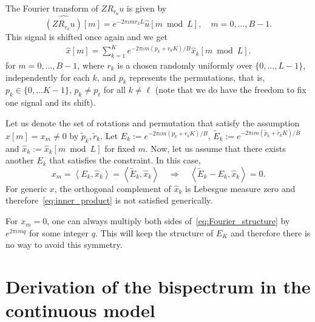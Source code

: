 \documentclass[english,12pt]{article}
\newcommand{\I}{\iota}
\newcommand{\hx}{\hat{x}}
\numberwithin{equation}{section}
\numberwithin{thm}{section} %
\begin{document}
The Fourier transform of $ZR_{r_k}u$ is  given by 
\begin{equation}
\widehat{(ZR_{r_k}u)}[m] = e^{-2\pi\I m r_k L} \hat{u}[m\bmod L], \quad m=0,\ldots,B-1.
\end{equation}
This signal is shifted once again and we get
\begin{eqnarray} \label{eq:Fourier_structure}
\hat{x}[m] = \sum_{k=1}^K e^{-2\pi\I m( p_k+r_k K)/B} \hat{x}_k[m \bmod L]. 
\end{eqnarray}
for $m=0,\ldots,B-1$, 
where $r_k$ is a chosen randomly uniformly over $\{0,\ldots,L-1\}$, independently for each $k$, and $p_k$ represents the permutations, that is, $p_k\in\{0,\ldots K-1\}$, $p_k\neq p_\ell$ for all $k\neq \ell$ (note that we do have the freedom to fix one signal and its shift). 

Let us denote the set of rotations and permutation that satisfy the assumption  $\hx[m]=x_m\neq 0$ by $\tilde{p}_k,\tilde{r}_k$. Let $E_k:=e^{-2\pi\I m( p_k+r_k K)/B}$, $\tilde{E}_k:=e^{-2\pi\I m( \tilde{p}_k+\tilde{r}_k K)/B}$ and $\hx_k:=\hat{x}_k[m \bmod L]$ for fixed $m$. Now, let us assume that there exists another $E_k$ that satisfies the constraint. In this case,
\begin{equation} \label{eq:inner_product}
x_m=\left\langle E_k,\hx_k\right\rangle = \left\langle \tilde{E}_k,\hx_k\right\rangle \quad \Rightarrow \quad\left\langle \tilde{E}_k -{E}_k,\hx_k\right\rangle =0.
\end{equation} 
For generic $x$, the orthogonal complement of $\hx_k$ is Lebesgue measure zero and therefore~\eqref{eq:inner_product} is not satisfied generically.  

For $x_m=0$, one can always multiply both sides of~\eqref{eq:Fourier_structure} by $e^{2\pi\I m q }$ for some integer $q$. This will keep the structure of $E_K$ and therefore there is no way to avoid this symmetry. 

\section{Derivation of the bispectrum in the continuous model} \label{sec:continuous_bispectrum}
\end{document}

